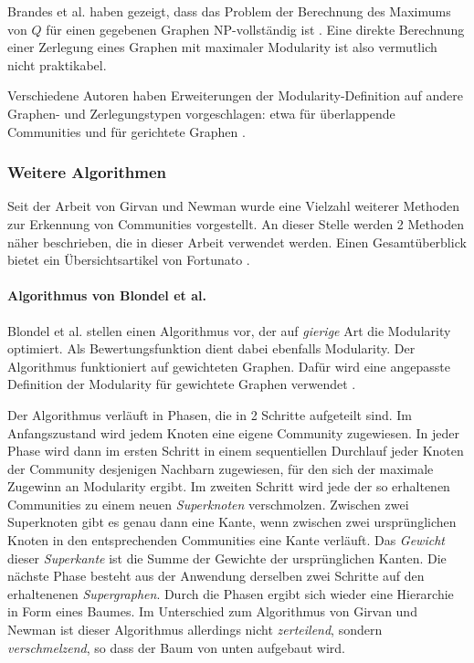 Brandes et al. haben gezeigt, dass das Problem der Berechnung des
Maximums von $Q$ für einen gegebenen Graphen NP-vollständig
ist \cite{DBLP:journals/tkde/BrandesDGGHNW08}. Eine direkte Berechnung
einer Zerlegung eines Graphen mit maximaler Modularity ist also
vermutlich nicht praktikabel.

Verschiedene Autoren haben Erweiterungen der Modularity-Definition auf
andere Graphen- und Zerlegungstypen vorgeschlagen: etwa für
überlappende Communities \cite{Nicosia2009} und für gerichtete
Graphen \cite{Leicht2008}.

\subsubsection{Weitere Algorithmen}
\label{sec:algorithmen}

Seit der Arbeit von Girvan und Newman wurde eine Vielzahl weiterer
Methoden zur Erkennung von Communities vorgestellt. An dieser Stelle
werden 2 Methoden näher beschrieben, die in dieser Arbeit verwendet
werden. Einen Gesamtüberblick bietet ein Übersichtsartikel von
Fortunato \cite{Fortunato2010}.

\paragraph{Algorithmus von Blondel et al.}
\label{sec:algor-von-blond}

Blondel et al.\cite{Blondel2008} stellen einen Algorithmus vor, der
auf \emph{gierige} Art die Modularity optimiert.  Als
Bewertungsfunktion dient dabei ebenfalls Modularity. Der Algorithmus
funktioniert auf gewichteten Graphen. Dafür wird eine angepasste
Definition der Modularity für gewichtete Graphen
verwendet \cite{Newman2004a}.

Der Algorithmus verläuft in Phasen, die in 2 Schritte aufgeteilt
sind. Im Anfangszustand wird jedem Knoten eine eigene Community
zugewiesen. In jeder Phase wird dann im ersten Schritt in einem
sequentiellen Durchlauf jeder Knoten der Community desjenigen
Nachbarn zugewiesen, für den sich der maximale Zugewinn an
Modularity ergibt. Im zweiten Schritt wird jede der so erhaltenen
Communities zu einem neuen \emph{Superknoten} verschmolzen. Zwischen
zwei Superknoten gibt es genau dann eine Kante, wenn zwischen zwei
ursprünglichen Knoten in den entsprechenden Communities eine Kante
verläuft. Das \emph{Gewicht} dieser \emph{Superkante} ist die Summe
der Gewichte der ursprünglichen Kanten. Die nächste Phase besteht
aus der Anwendung derselben zwei Schritte auf den erhaltenenen
\emph{Supergraphen}. Durch die Phasen ergibt sich wieder eine
Hierarchie in Form eines Baumes. Im Unterschied zum Algorithmus von
Girvan und Newman ist dieser Algorithmus allerdings nicht
\emph{zerteilend}, sondern \emph{verschmelzend}, so dass der Baum von
unten aufgebaut wird.

